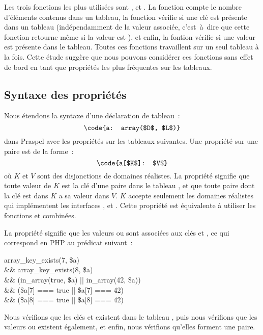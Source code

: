 %
Les trois fonctions les plus utilisées sont ,
 et . La fonction 
compte le nombre d'éléments contenus dans un tableau, la fonction
 vérifie si une clé est présente dans un tableau
(indépendamment de la valeur associée, c'est~à~dire que cette fonction retourne
 même si la valeur est ), et enfin, la fontion
 vérifie si une valeur est présente dans le tableau. Toutes
ces fonctions travaillent sur un seul tableau à la fois. Cette étude suggère que
nous pouvons considérer ces fonctions sans effet de bord en tant que propriétés
les plus fréquentes sur les tableaux.

\subsection{Syntaxe des propriétés}
\label{subsection:data:array_properties}

Nous étendons la syntaxe d'une déclaration de tableau~:
%
$$\code{a: array($D$, $L$)}$$
%
dans Praspel avec les propriétés sur les tableaux suivantes. Une propriété sur
une paire est de la forme~:
%
$$\code{a[$K$]: $V$}$$
%
où $K$ et $V$ sont des disjonctions de domaines réalistes. La propriété signifie
que toute valeur de $K$ est la clé d'une paire dans le tableau , et que
toute paire dont la clé est dans $K$ a sa valeur dans $V$. $K$ accepte
seulement les domaines réalistes qui implémentent les interfaces
,  et . Cette propriété est
équivalente à utiliser les fonctions  et
 combinées.

\begin{example}

La propriété  signifie que les valeurs  ou
 sont associées aux clés  et , ce qui correspond en PHP
au prédicat suivant~:
%
\begin{pre}
   array\_key\_exists(7, \$a) \\
\&\& array\_key\_exists(8, \$a) \\
\&\& (in\_array(true, \$a) || in\_array(42, \$a)) \\
\&\& (\$a[7] === true     || \$a[7] === 42) \\
\&\& (\$a[8] === true     || \$a[8] === 42)
\end{pre}
%
Nous vérifions que les clés  et  existent dans le tableau
, puis nous vérifions que les valeurs  ou 
existent également, et enfin, nous vérifions qu'elles forment une paire.

\end{example}

